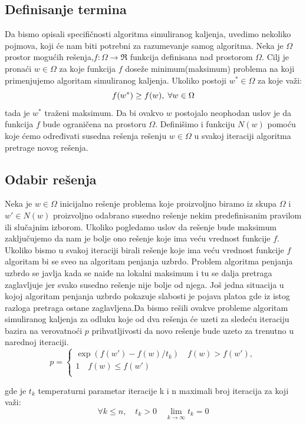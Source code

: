 \documentclass[a4paper]{article}
\begin{document}
\subsection{Definisanje termina}
Da bismo opisali specifičnosti algoritma simuliranog kaljenja, uvedimo nekoliko pojmova, koji će nam biti potrebni za razumevanje samog algoritma. Neka je $\Omega$ prostor mogućih rešenja,$f:\Omega \rightarrow \Re$ funkcija definisana nad prostorom $\Omega$. Cilj je pronaći  $w\in\Omega$ za koje funkcija $f$ doseže minimum(maksimum) problema na koji primenjujemo algoritam simuliranog kaljenja. Ukoliko postoji $w^*\in\Omega$ za koje  važi:$$f(w^*)\geq f(w),\hspace{0.1cm} \forall w \in \Omega$$ tada je $w^*$ traženi maksimum. Da bi ovakvo $w$ postojalo neophodan uslov je da funkcija $f$ bude ograničena na prostoru $\Omega$. Definišimo i funkciju $N(w)$ pomoću koje ćemo određivati susedna rešenja rešenju  $w\in\Omega$ u svakoj iteraciji algoritma pretrage novog rešenja. \par

\subsection{Odabir rešenja}
Neka je $w\in\Omega$ inicijalno rešenje problema koje proizvoljno biramo iz skupa $\Omega$ i $w'\in N(w)$ proizvoljno odabrano susedno rešenje nekim predefinisanim pravilom ili slučajnim izborom. Ukoliko pogledamo uslov da rešenje bude maksimum zaključujemo da nam je bolje ono rešenje koje ima veću vrednost funkcije $f$. Ukoliko bismo u svakoj iteraciji birali rešenje koje ima veću vrednost funkcije $f$ algoritam bi se sveo na algoritam penjanja uzbrdo. Problem algoritma penjanja uzbrdo se javlja kada se naiđe na lokalni maksimum i tu se dalja pretraga zaglavljuje jer svako susedno rešenje nije bolje od njega. Još jedna situacija u kojoj algoritam penjanja uzbrdo pokazuje slabosti je pojava platoa gde iz istog razloga pretraga ostane zaglavljena.Da bismo rešili ovakve probleme algoritam simuliranog kaljenja za odluku koje od dva rešenja će uzeti za sledeću iteraciju bazira na verovatnoći $p$ prihvatljivosti da novo rešenje bude uzeto za trenutno u narednoj iteraciji.
\[ p =
  \begin{cases}
    \exp(f(w')-f(w)/t_k)  \quad f(w) > f(w'),\\
    1  \quad f(w) \leq f(w')\\
  \end{cases}
\]


gde je $t_k$ temperaturni parametar iteracije k i n maximali broj iteracija za koji važi:
$$\forall k\leq n, \quad t_k > 0 \quad \lim_{k \to \infty}t_k=0 $$
\end{document}
